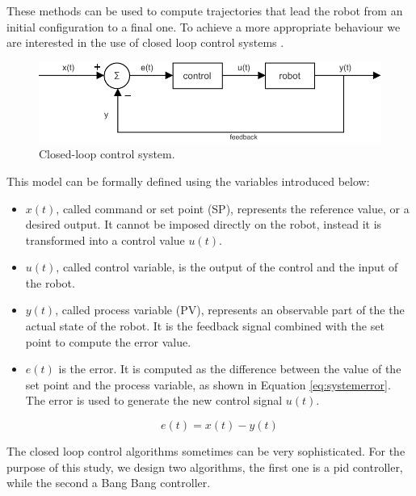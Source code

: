 These methods can be used to compute trajectories that lead the robot from an 
initial configuration to a final one. To achieve a more appropriate behaviour we 
are interested in the use of closed loop control systems 
\cite[][]{siegwart2011introduction}.

\begin{figure}[!htb]
	\centering
	\includegraphics[width=.8\textwidth]{contents/images/closed-loop-control-system}
	\caption{Closed-loop control system.}
	\label{fig:closedloopcontrol}
\end{figure}
This model can be formally defined using the variables introduced below: 
\begin{itemize}
	\item $x(t)$, called command or set point (SP), represents the reference 
	value, or a desired output. It cannot be imposed directly on the robot, instead it 
	is transformed into a control value $u(t)$.
	
	\item $u(t)$, called control variable, is the output of the control and the 
	input of the robot.
	
	\item $y(t)$, called process variable (PV), represents an observable part of the 
	the actual state of the robot. It is the feedback signal combined with the set 
	point to compute the error value.

	\item $e(t)$ is the error. It is computed as the difference between the value of 
	the set point and the process variable, as shown in Equation 
	\ref{eq:systemerror}. The error is used to generate the new control signal $u(t)$.
	\begin{Equation}[!h]
		\centering
		\begin{equation}
		e(t) = x(t) - y(t)
		\end{equation}
		\caption{Calculation of the error value $e(t)$ of the system.}
		\label{eq:systemerror}
	\end{Equation}	
\end{itemize} 

The closed loop control algorithms sometimes can be very sophisticated. For the 
purpose of this study, we design two algorithms, the first one is a \gls{pid} 
controller, while the second a Bang Bang controller.

